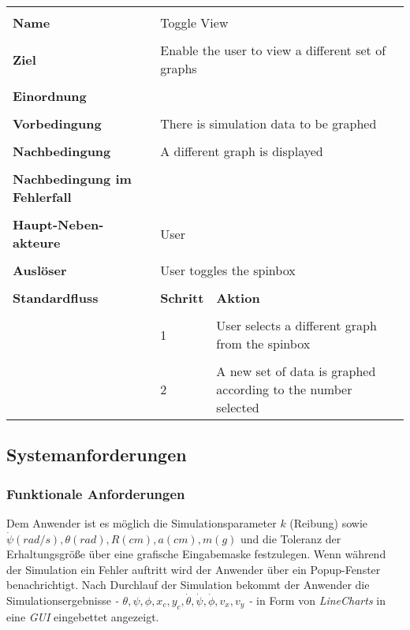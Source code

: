 {\begin{tabular}{|p{5cm}|p{2cm}|p{3cm}|}
\hline \\
\textbf{Name} & \multicolumn{2}{p{5cm}|}{Toggle View} \\
\hline \\
\textbf{Ziel} & \multicolumn{2}{p{5cm}|}{Enable the user to view a different set of graphs} \\
\hline \\
\textbf{Einordnung} & \multicolumn{2}{p{5cm}|}{} \\
\hline \\
\textbf{Vorbedingung} & \multicolumn{2}{p{5cm}|}{There is simulation data to be graphed} \\
\hline \\
\textbf{Nachbedingung} & \multicolumn{2}{p{5cm}|}{A different graph is displayed} \\
\hline \\
\textbf{Nachbedingung im Fehlerfall} & \multicolumn{2}{p{5cm}|}{}\\
\hline \\
\textbf{Haupt-Neben-akteure} & \multicolumn{2}{p{5cm}|}{User} \\
\hline \\
\textbf{Ausl\"oser} & \multicolumn{2}{p{5cm}|}{User toggles the spinbox} \\
\hline \\
\textbf{Standardfluss} & \textbf{Schritt}& \textbf{Aktion} \\
\hline \\
& 1 & User selects a different graph from the spinbox\\
\hline \\
& 2 & A new set of data is graphed according to the number selected \\
\hline
\end{tabular}

\subsection*{Systemanforderungen}
\subsubsection*{Funktionale Anforderungen}

{Dem Anwender ist es m\"oglich die Simulationsparameter $k$ (Reibung) sowie 
$ \dot \psi (rad/s), \theta (rad), R (cm), a (cm), m (g)$ und die Toleranz der Erhaltungsgr\"o\ss e  \"uber eine grafische Eingabemaske festzulegen. %
Wenn w\"ahrend der Simulation ein Fehler auftritt wird der Anwender 
\"uber ein Popup-Fenster benachrichtigt. Nach Durchlauf der Simulation
bekommt der Anwender die Simulationsergebnisse 
\textit{ - $\theta, \psi, \phi, x_c, y_c, \dot \theta, \dot \psi, 
\dot \phi,v_x,v_y$ -} in Form von \textit{LineCharts} in eine \textit{GUI} 
eingebettet angezeigt.} 

}
